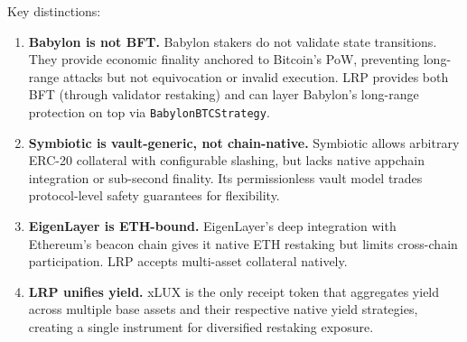 Key distinctions:

\begin{enumerate}[leftmargin=1.5em]
  \item \textbf{Babylon is not BFT.}  Babylon stakers do not validate state transitions.
    They provide economic finality anchored to Bitcoin's PoW, preventing long-range attacks
    but not equivocation or invalid execution.  LRP provides both BFT (through validator
    restaking) and can layer Babylon's long-range protection on top via
    \texttt{BabylonBTCStrategy}.
  \item \textbf{Symbiotic is vault-generic, not chain-native.}  Symbiotic allows arbitrary
    ERC-20 collateral with configurable slashing, but lacks native appchain integration or
    sub-second finality.  Its permissionless vault model trades protocol-level safety
    guarantees for flexibility.
  \item \textbf{EigenLayer is ETH-bound.}  EigenLayer's deep integration with Ethereum's
    beacon chain gives it native ETH restaking but limits cross-chain participation.
    LRP accepts multi-asset collateral natively.
  \item \textbf{LRP unifies yield.}  xLUX is the only receipt token that aggregates yield
    across multiple base assets and their respective native yield strategies, creating a
    single instrument for diversified restaking exposure.
\end{enumerate}

